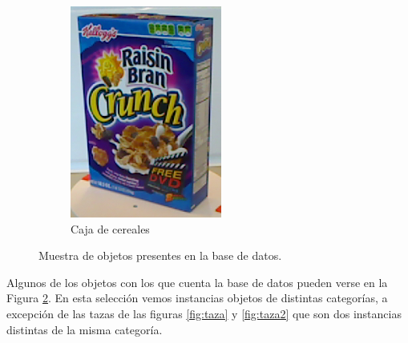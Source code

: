 \begin{figure}
\begin{subfigure}[b]{0.4\textwidth}
        \includegraphics[width=\textwidth]{img/base_rgbd/caja.png}
        \caption{Caja de cereales}
		\label{fig:caja}
    \end{subfigure}
    \caption{Muestra de objetos presentes en la base de datos.}
    \label{fig:ejemplo_objetos_base}
\end{figure}

Algunos de los objetos con los que cuenta la base de datos pueden verse en la Figura \ref{fig:ejemplo_objetos_base}. En esta selección vemos instancias objetos de distintas categorías, a excepción de las tazas de las figuras \ref{fig:taza} y \ref{fig:taza2} que son dos instancias distintas de la misma categoría.


